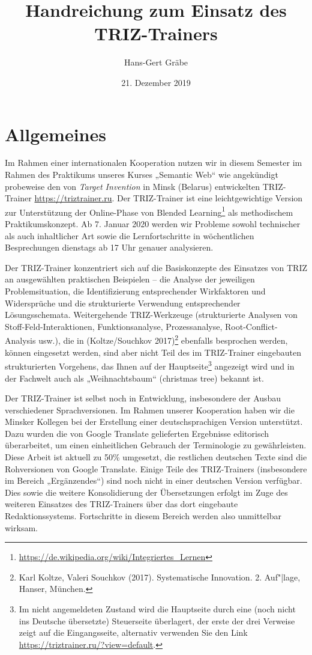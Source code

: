 \documentclass[11pt,a4paper]{article}
\title{Handreichung zum Einsatz des TRIZ-Trainers}
\author{Hans-Gert Gr\"abe}
\date{21. Dezember 2019}
\begin{document}
\maketitle

\section{Allgemeines}

Im Rahmen einer internationalen Kooperation nutzen wir in diesem Semester im
Rahmen des Praktikums unseres Kurses „Semantic Web“ wie angekündigt probeweise
den von \emph{Target Invention} in Minsk (Belarus) entwickelten TRIZ-Trainer
\url{https://triztrainer.ru}.  Der TRIZ-Trainer ist eine leichtgewichtige
Version zur Unterstützung der Online-Phase von Blended
Learning\footnote{\url{https://de.wikipedia.org/wiki/Integriertes_Lernen}} als
methodischem Praktikumskonzept.  Ab 7. Januar 2020 werden wir Probleme sowohl
technischer als auch inhaltlicher Art sowie die Lernfortschritte in
wöchentlichen Besprechungen dienstags ab 17 Uhr genauer analysieren. 

Der TRIZ-Trainer konzentriert sich auf die Basiskonzepte des Einsatzes von
TRIZ an ausgewählten praktischen Beispielen -- die Analyse der jeweiligen
Problemsituation, die Identifizierung entsprechender Wirkfaktoren und
Widersprüche und die strukturierte Verwendung entsprechender Lösungsschemata.
Weitergehende TRIZ-Werkzeuge (strukturierte Analysen von
Stoff-Feld-Interaktionen, Funktionsanalyse, Prozessanalyse,
Root-Conflict-Analysis usw.), die in (Koltze/Souchkov 2017)\footnote{Karl
  Koltze, Valeri Souchkov (2017). Systematische Innovation.  2. Auf"|lage,
  Hanser, München.} ebenfalls besprochen werden, können eingesetzt werden,
sind aber nicht Teil des im TRIZ-Trainer eingebauten strukturierten Vorgehens,
das Ihnen auf der Hauptseite\footnote{Im nicht angemeldeten Zustand wird die
  Hauptseite durch eine (noch nicht ins Deutsche übersetzte) Steuerseite
  überlagert, der erste der drei Verweise zeigt auf die Eingangsseite,
  alternativ verwenden Sie den Link
  \url{https://triztrainer.ru/?view=default}.} angezeigt wird und in der
Fachwelt auch als „Weihnachtsbaum“ (christmas tree) bekannt ist.

Der TRIZ-Trainer ist selbst noch in Entwicklung, insbesondere der Ausbau
verschiedener Sprachversionen.  Im Rahmen unserer Kooperation haben wir die
Minsker Kollegen bei der Erstellung einer deutschsprachigen Version
unterstützt.  Dazu wurden die von Google Translate gelieferten Ergebnisse
editorisch überarbeitet, um einen einheitlichen Gebrauch der Terminologie zu
gewährleisten. Diese Arbeit ist aktuell zu 50\% umgesetzt, die restlichen
deutschen Texte sind die Rohversionen von Google Translate.  Einige Teile des
TRIZ-Trainers (insbesondere im Bereich „Ergänzendes“) sind noch nicht in einer
deutschen Version verfügbar. Dies sowie die weitere Konsolidierung der
Übersetzungen erfolgt im Zuge des weiteren Einsatzes des TRIZ-Trainers über
das dort eingebaute Redaktionssystems. Fortschritte in diesem Bereich werden
also unmittelbar wirksam.
\end{document}
